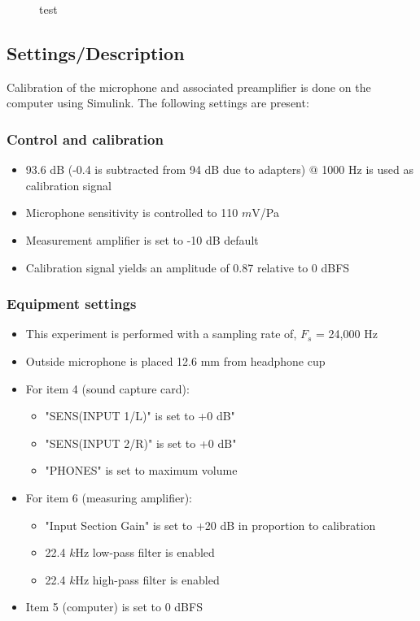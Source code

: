 \begin{figure}[H]
	\centering
	
	\caption{test}
	\label{test}
\end{figure}

\subsection{Settings/Description}
\label{SettingsHeadPhones}
Calibration of the microphone and associated preamplifier is done on the computer using Simulink\textsuperscript{\textregistered}. The following settings are present:

\subsubsection{Control and calibration}
\begin{itemize}

	\item 93.6 dB (-0.4 is subtracted from 94 dB due to adapters) $@$ 1000 Hz is used as calibration signal
	\item Microphone sensitivity is controlled to 110 $m$V/Pa
	\item Measurement amplifier is set to -10 dB default
	\item Calibration signal yields an amplitude of 0.87 relative to 0 dBFS
\end{itemize}
\subsubsection{Equipment settings}
\begin{itemize}
	\item This experiment is performed with a sampling rate of, $F_{s}$ = 24,000 Hz
	\item Outside microphone is placed 12.6 mm from headphone cup
	\item For item 4 (sound capture card):
	\begin{itemize}
		\item "SENS(INPUT 1/L)" is set to +0 dB"
		\item "SENS(INPUT 2/R)" is set to +0 dB"
		\item "PHONES" is set to maximum volume
	\end{itemize}		
	\item For item 6 (measuring amplifier):
		\begin{itemize}
			\item "Input Section Gain" is set to +20 dB in proportion to calibration
			\item 22.4 $k$Hz low-pass filter is enabled
			\item 22.4 $k$Hz high-pass filter is enabled 
		\end{itemize}
	\item Item 5 (computer) is set to 0 dBFS
\end{itemize}



